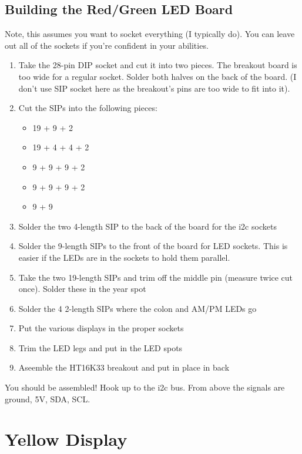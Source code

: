 \documentclass[11pt]{article}
\begin{document}
\subsection{Building the Red/Green LED Board}

Note, this assumes you want to socket everything (I typically do).
You can leave out all of the sockets if you're confident in your
abilities.

\begin{enumerate}
\item Take the 28-pin DIP socket and cut it into two pieces.
      The breakout board is too wide for a regular socket.
      Solder both halves on the back of the board.
      (I don't use SIP socket here as the breakout's pins are too
       wide to fit into it).
\item Cut the SIPs into the following pieces:
\begin{itemize}
\item 19 + 9 + 2
\item 19 + 4 + 4 + 2
\item 9 + 9 + 9 + 2
\item 9 + 9 + 9 + 2
\item 9 + 9
\end{itemize}
\item Solder the two 4-length SIP to the back of the board
      for the i2c sockets
\item Solder the 9-length SIPs to the front of the board for LED
      sockets.  This is easier if the LEDs are in the sockets to
      hold them parallel.
\item Take the two 19-length SIPs and trim off the middle pin
      (measure twice cut once).  Solder these in the year spot
\item Solder the 4 2-length SIPs where the colon and AM/PM LEDs go
\item Put the various displays in the proper sockets
\item Trim the LED legs and put in the LED spots
\item Aseemble the HT16K33 breakout and put in place in back
\end{enumerate}

You should be assembled!  Hook up to the i2c bus.  From above
the signals are ground, 5V, SDA, SCL.



\section{Yellow Display}
\end{document}
